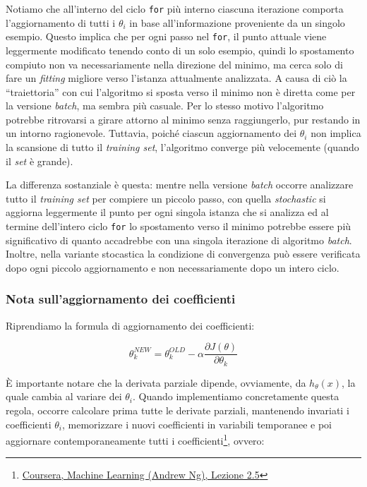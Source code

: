 Notiamo che all'interno del ciclo \texttt{for} più interno ciascuna iterazione comporta l'aggiornamento di tutti i $\theta_i$ in base all'informazione proveniente da un singolo esempio. Questo implica che per ogni passo nel \texttt{for}, il punto attuale viene leggermente modificato tenendo conto di un solo esempio, quindi lo spostamento compiuto non va necessariamente nella direzione del minimo, ma cerca solo di fare un \emph{fitting} migliore verso l'istanza attualmente analizzata. A causa di ciò la ``traiettoria'' con cui l'algoritmo si sposta verso il minimo non è diretta come per la versione \emph{batch}, ma sembra più casuale. Per lo stesso motivo l'algoritmo potrebbe ritrovarsi a girare attorno al minimo senza raggiungerlo, pur restando in un intorno ragionevole. Tuttavia, poiché ciascun aggiornamento dei $\theta_i$ non implica la scansione di tutto il \emph{training set}, l'algoritmo converge più velocemente (quando il \emph{set} è grande).

La differenza sostanziale è questa: mentre nella versione \emph{batch} occorre analizzare tutto il \emph{training set} per compiere un piccolo passo, con quella \emph{stochastic} si aggiorna leggermente il punto per ogni singola istanza che si analizza ed al termine dell'intero ciclo \texttt{for} lo spostamento verso il minimo potrebbe essere più significativo di quanto accadrebbe con una singola iterazione di algoritmo \emph{batch}. Inoltre, nella variante stocastica la condizione di convergenza può essere verificata dopo ogni piccolo aggiornamento e non necessariamente dopo un intero ciclo.

\subsubsection{Nota sull'aggiornamento dei coefficienti}
Riprendiamo la formula di aggiornamento dei coefficienti:

\begin{equation*}
  \theta_k^{NEW} = \theta_k^{OLD} - \alpha \frac{ \partial J(\theta)}{ \partial \theta_k}
\end{equation*}

È importante notare che la derivata parziale dipende, ovviamente, da $h_\theta(x)$, la quale cambia al variare dei $\theta_i$. Quando implementiamo concretamente questa regola, occorre calcolare prima tutte le derivate parziali, mantenendo invariati i coefficienti $\theta_i$, memorizzare i nuovi coefficienti in variabili temporanee e poi aggiornare contemporaneamente tutti i coefficienti\footnote{\href{http://www.youtube.com/watch?v=eikJboPQDT0}{Coursera, Machine Learning (Andrew Ng), Lezione 2.5}}, ovvero:

